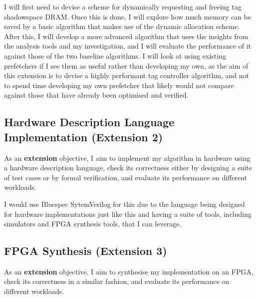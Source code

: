 \documentclass[10pt,a4paper]{article}
\begin{document}
I will first need to devise a scheme for dynamically requesting and freeing tag shadowspace DRAM. Once this is done, I will explore how much memory can be saved by a basic algorithm that makes use of the dynamic allocation scheme. After this, I will develop a more advanced algorithm that uses the insights from the analysis tools and my investigation, and I will evaluate the performance of it against those of the two baseline algorithms. I will look at using existing prefetchers if I see them as useful rather than developing my own, as the aim of this extension is to devise a highly performant tag controller algorithm, and not to spend time developing my own prefetcher that likely would not compare against those that have already been optimised and verified.

\subsection*{Hardware Description Language Implementation (Extension 2)}
As an \textbf{extension} objective, I aim to implement my algorithm in hardware using a hardware description language, check its correctness either by designing a suite of test cases or by formal verification, and evaluate its performance on different workloads.

I would use Bluespec SytemVerilog for this due to the language being designed for hardware implementations just like this and having a suite of tools, including simulators and FPGA synthesis tools, that I can leverage.

\subsection*{FPGA Synthesis (Extension 3)}
As an \textbf{extension} objective, I aim to synthesise my implementation on an FPGA, check its correctness in a similar fashion, and evaluate its performance on different workloads.
\end{document}
